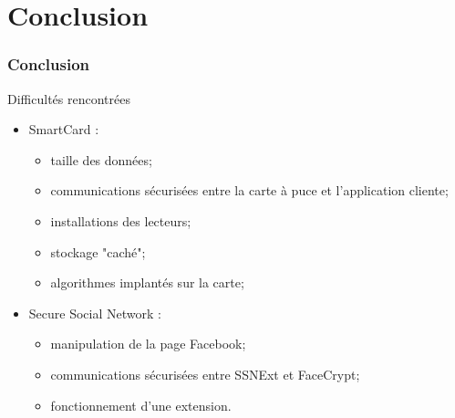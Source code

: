 \documentclass{beamer}
\begin{document}
\section{Conclusion}
\begin{frame}
\frametitle{Conclusion}
\begin{block}{Difficultés rencontrées}
\begin{itemize}
    \item SmartCard : 
    \begin{itemize}
        \item taille des données; %
        \item communications sécurisées entre la carte à puce et l'application
            cliente;
        \item installations des lecteurs;
        \item stockage "caché"; %
        \item algorithmes implantés sur la carte;
    \end{itemize}
    \item Secure Social Network : 
        \begin{itemize}
            \item manipulation de la page Facebook;
            \item communications sécurisées entre SSNExt et FaceCrypt;
            \item fonctionnement d'une extension.
        \end{itemize}
\end{itemize}
\end{block}
\end{frame}
\end{document}
